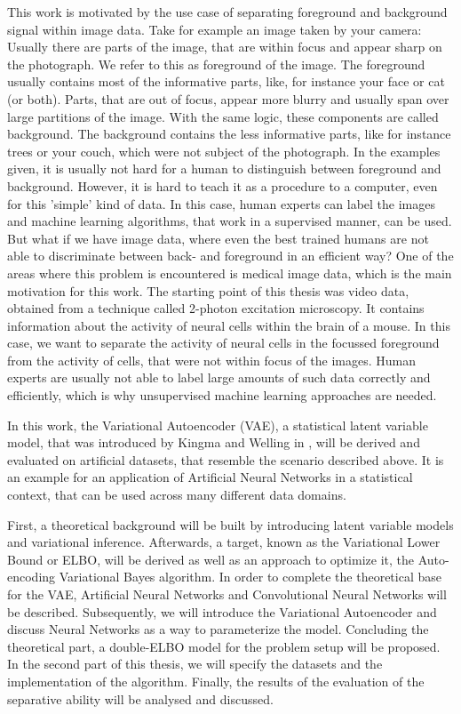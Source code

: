\documentclass[12pt]{report}
\theoremstyle{definition}
\begin{document}
This work is motivated by the use case of separating foreground and background signal within image data. Take for example an image taken by your camera: Usually there are parts of the image, that are within focus and appear sharp on the photograph. We refer to this as foreground of the image. The foreground usually contains most of the informative parts, like, for instance your face or cat (or both). Parts, that are out of focus, appear more blurry and usually span over large partitions of the image. With the same logic, these components are called background. The background contains the less informative parts, like for instance trees or your couch, which were not subject of the photograph. In the examples given, it is usually not hard for a human to distinguish between foreground and background. However, it is hard to teach it as a procedure to a computer, even for this 'simple' kind of data. In this case, human experts can label the images and machine learning algorithms, that work in a supervised manner, can be used. But what if we have image data, where even the best trained humans are not able to discriminate between back- and foreground in an efficient way? One of the areas where this problem is encountered is medical image data, which is the main motivation for this work. The starting point of this thesis was video data, obtained from a technique called 2-photon excitation microscopy. It contains information about the activity of neural cells within the brain of a mouse. In this case, we want to separate the activity of neural cells in the focussed foreground from the activity of cells, that were not within focus of the images. Human experts are usually not able to label large amounts of such data correctly and efficiently, which is why unsupervised machine learning approaches are needed.

In this work, the Variational Autoencoder (VAE), a statistical latent variable model, that was introduced by Kingma and Welling in \cite{kingma2}, will be derived and evaluated on artificial datasets, that resemble the scenario described above. It is an example for an application of Artificial Neural Networks in a statistical context, that can be used across many different data domains. 

First, a theoretical background will be built by introducing latent variable models and variational inference. Afterwards, a target, known as the Variational Lower Bound or ELBO, will be derived as well as an approach to optimize it, the Auto-encoding Variational Bayes algorithm. In order to complete the theoretical base for the VAE, Artificial Neural Networks and Convolutional Neural Networks will be described. Subsequently, we will introduce the Variational Autoencoder and discuss Neural Networks as a way to parameterize the model. Concluding the theoretical part, a double-ELBO model for the problem setup will be proposed.
In the second part of this thesis, we will specify the datasets and the implementation of the algorithm. Finally, the results of the evaluation of the separative ability will be analysed and discussed.
\end{document}
